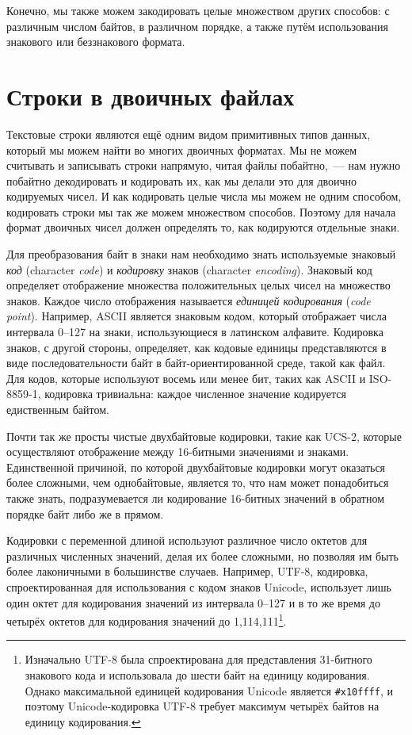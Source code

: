 Конечно, мы также можем закодировать целые множеством других способов: с различным числом
байтов, в различном порядке, а также путём использования знакового или беззнакового
формата.

\section{Строки в двоичных файлах}

Текстовые строки являются ещё одним видом примитивных типов данных, который мы можем найти
во многих двоичных форматах. Мы не можем считывать и записывать строки напрямую, читая
файлы побайтно,~--- нам нужно побайтно декодировать и кодировать их, как мы делали это для
двоично кодируемых чисел. И как кодировать целые числа мы можем не одним способом,
кодировать строки мы так же можем множеством способов. Поэтому для начала формат двоичных
чисел должен определять то, как кодируются отдельные знаки.

Для преобразования байт в знаки нам необходимо знать используемые знаковый \textit{код}
(character \textit{code}) и \textit{кодировку} знаков (character
\textit{encoding}). Знаковый код определяет отображение множества положительных целых
чисел на множество знаков. Каждое число отображения называется \textit{единицей
  кодирования} (\textit{code point}). Например, ASCII является знаковым кодом, который
отображает числа интервала 0--127 на знаки, исполь\-зую\-щие\-ся в латинском алфавите. Кодировка
знаков, с другой стороны, определяет, как кодовые единицы представляются в виде
последовательности байт в байт-ориентированной среде, такой как файл. Для кодов, которые
используют восемь или менее бит, таких как ASCII и ISO-8859-1, кодировка тривиальна:
каждое численное значение кодируется едиственным байтом.

Почти так же просты чистые двухбайтовые кодировки, такие как UCS-2, которые осуществляют
отображение между 16-битными значениями и знаками. Единственной причиной, по которой
двухбайтовые кодировки могут оказаться более сложными, чем однобайтовые, является то, что
нам может понадобиться также знать, подразумевается ли кодирование 16-битных значений в
обратном порядке байт либо же в прямом.

Кодировки с переменной длиной используют различное число октетов для различных численных
значений, делая их более сложными, но позволяя им быть более лаконичными в большинстве
случаев. Например, UTF-8, кодировка, спроектированная для использования с кодом знаков
Unicode, использует лишь один октет для кодирования значений из интервала 0--127 и в то же
время до четырёх октетов для кодирования значений до 1,114,111\footnote{Изначально UTF-8
  была спроектирована для представления 31-битного знакового кода и использовала до шести
  байт на единицу кодирования. Однако максимальной единицей кодирования Unicode является
  \lstinline!#x10ffff!, и поэтому Unicode-кодировка UTF-8 требует максимум четырёх байтов на
  единицу кодирования.}\hspace{\footnotenegspace}.

